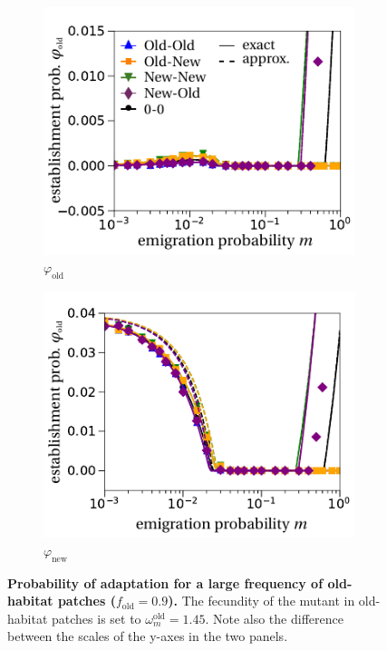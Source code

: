 \documentclass[a4paper,11pt]{scrartcl}
\begin{document}
\begin{figure}[h!]
	\centering
	\begin{subfigure}{.5\textwidth}
  		\centering
  		\includegraphics[width=\linewidth]{figS5a.pdf}
  		\caption{$\varphi_{\text{old}}$}
	\end{subfigure}%
	\begin{subfigure}{.5\textwidth}
 		 \centering
 		 \includegraphics[width=\linewidth]{figS5b.pdf}
  	\caption{$\varphi_{\text{new}}$}
	\end{subfigure}
	\caption{\textbf{Probability of adaptation for a large frequency of old-habitat patches ($f_{\text{old}}=0.9$).} The fecundity of the mutant in old-habitat patches is set to $\omega^\text{old}_m=1.45$. Note also the difference between the scales of the y-axes in the two panels.}
	\label{Sfig:vary_f}
\end{figure}
\end{document}
